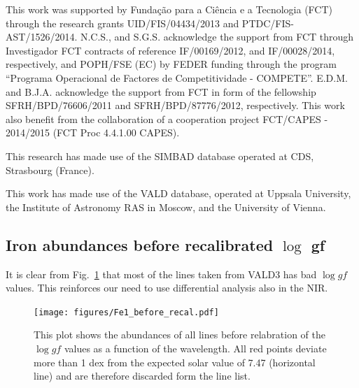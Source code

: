 \documentclass{aa}
\begin{document}
\begin{acknowledgements}

This work was supported by Funda\c{c}\~ao para a Ci\^encia e a
Tecnologia (FCT) through the research grants UID/FIS/04434/2013 and
PTDC/FIS-AST/1526/2014. N.C.S., and S.G.S. acknowledge the support from
FCT through Investigador FCT contracts of reference IF/00169/2012, and
IF/00028/2014, respectively, and POPH/FSE (EC) by FEDER funding through
the program “Programa Operacional de Factores de Competitividade
- COMPETE”. E.D.M. and B.J.A. acknowledge the support from FCT in
form of the fellowship SFRH/BPD/76606/2011 and SFRH/BPD/87776/2012,
respectively. This work also benefit from the collaboration of a
cooperation project FCT/CAPES - 2014/2015 (FCT Proc 4.4.1.00 CAPES).

This research has made use of the SIMBAD database operated at CDS,
Strasbourg (France).

This work has made use of the VALD database, operated at Uppsala
University, the Institute of Astronomy RAS in Moscow, and the University
of Vienna.

\end{acknowledgements}






\begin{appendix}
\section{Iron abundances before recalibrated $\log$ gf}
\label{sec:section label}

It is clear from Fig.~\ref{fig:fe1_before_recal} that most of the lines taken
from VALD3 has bad $\log\mathit{gf}$ values. This reinforces our need to
use differential analysis also in the NIR.

\begin{figure}[tbp!]
    \centering
    \texttt{[image: figures/Fe1\_before\_recal.pdf]}
    \caption{This plot shows the abundances of all  lines before
    relabration of the $\log\mathit{gf}$ values as a function of the wavelength.
    All red points deviate more than 1 dex from the expected solar value of
    7.47 (horizontal line) and are therefore discarded form the line list.}
    \label{fig:fe1_before_recal}
\end{figure}


\end{appendix}
\end{document}
